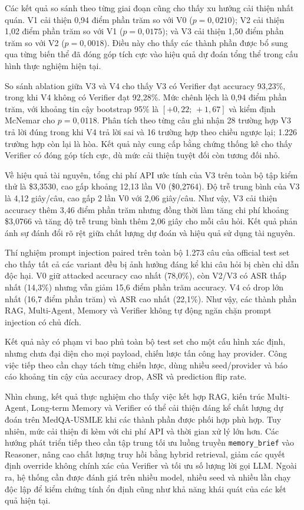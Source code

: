 Các kết quả so sánh theo từng giai đoạn cũng cho thấy xu hướng cải
thiện nhất quán. V1 cải thiện 0,94 điểm phần trăm so với V0
($p=0{,}0210$); V2 cải thiện 1,02 điểm phần trăm so với V1
($p=0{,}0175$); và V3 cải thiện 1,50 điểm phần trăm so với V2
($p=0{,}0018$). Điều này cho thấy các thành phần được bổ sung qua
từng biến thể đã đóng góp tích cực vào hiệu quả dự đoán tổng thể
trong cấu hình thực nghiệm hiện tại.

So sánh ablation giữa V3 và V4 cho thấy V3 có Verifier đạt accuracy
93,23\%, trong khi V4 không có Verifier đạt 92,28\%. Mức chênh lệch
là 0,94 điểm phần trăm, với khoảng tin cậy bootstrap 95\% là
$[+0{,}22;\,+1{,}67]$ và kiểm định McNemar cho $p=0{,}0118$.
Phân tích theo từng câu ghi nhận 28 trường hợp V3 trả lời đúng trong
khi V4 trả lời sai và 16 trường hợp theo chiều ngược lại; 1.226
trường hợp còn lại là hòa. Kết quả này cung cấp bằng chứng thống kê
cho thấy Verifier có đóng góp tích cực, dù mức cải thiện tuyệt đối
còn tương đối nhỏ.

Về hiệu quả tài nguyên, tổng chi phí API ước tính của V3 trên toàn
bộ tập kiểm thử là \$3,3530, cao gấp khoảng 12,13 lần V0
(\$0,2764). Độ trễ trung bình của V3 là 4,12 giây/câu, cao gấp
2 lần V0 với 2,06 giây/câu. Như vậy, V3 cải thiện accuracy thêm
3,46 điểm phần trăm nhưng đồng thời làm tăng chi phí khoảng
\$3,0766 và tăng độ trễ trung bình thêm 2,06 giây cho mỗi câu hỏi.
Kết quả phản ánh sự đánh đổi rõ rệt giữa chất lượng dự đoán và hiệu
quả sử dụng tài nguyên.

Thí nghiệm prompt injection paired trên toàn bộ 1.273 câu của official test
set cho thấy tất cả các variant đều bị ảnh hưởng đáng kể khi câu hỏi bị chèn
chỉ dẫn độc hại. V0 giữ attacked accuracy cao nhất (78,0\%), còn V2/V3 có
ASR thấp nhất (14,3\%) nhưng vẫn giảm 15,6 điểm phần trăm accuracy. V4 có
drop lớn nhất (16,7 điểm phần trăm) và ASR cao nhất (22,1\%). Như vậy, các
thành phần RAG, Multi-Agent, Memory và Verifier không tự động ngăn chặn
prompt injection có chủ đích.

Kết quả này có phạm vi bao phủ toàn bộ test set cho một cấu hình xác định,
nhưng chưa đại diện cho mọi payload, chiến lược tấn công hay provider. Công
việc tiếp theo cần chạy tách từng chiến lược, dùng nhiều seed/provider và
báo cáo khoảng tin cậy của accuracy drop, ASR và prediction flip rate.

Nhìn chung, kết quả thực nghiệm cho thấy việc kết hợp RAG, kiến trúc
Multi-Agent, Long-term Memory và Verifier có thể cải thiện đáng kể
chất lượng dự đoán trên MedQA-USMLE khi các thành phần được phối hợp
phù hợp. Tuy nhiên, mức cải thiện đi kèm với chi phí API và thời gian
xử lý lớn hơn. Các hướng phát triển tiếp theo cần tập trung tối ưu
luồng truyền \texttt{memory\_brief} vào Reasoner, nâng cao chất lượng
truy hồi bằng hybrid retrieval, giảm các quyết định override không
chính xác của Verifier và tối ưu số lượng lời gọi LLM. Ngoài ra, hệ
thống cần được đánh giá trên nhiều model, nhiều seed và nhiều lần
chạy độc lập để kiểm chứng tính ổn định cũng như khả năng khái quát
của các kết quả hiện tại.
